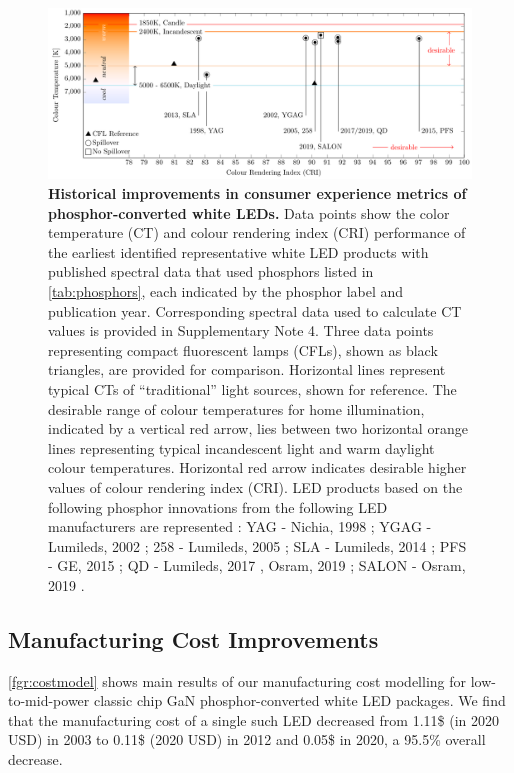 \documentclass[parskip=full]{article}
\begin{document}
\begin{figure}[h!]
 \centering
 \includegraphics[width=\textwidth]{figures/breakthroughs_consumer-experience.pdf}
 \caption{\textbf{Historical improvements in consumer experience metrics of phosphor-converted white LEDs.} Data points show the color temperature (CT) and colour rendering index (CRI) performance of the earliest identified representative white LED products with published spectral data that used phosphors listed in \cref{tab:phosphors}, each indicated by the phosphor label and publication year. Corresponding spectral data used to calculate CT values is provided in Supplementary Note 4. Three data points representing compact fluorescent lamps (CFLs)\cite{cie_reference}, shown as black triangles, are provided for comparison. Horizontal lines represent typical CTs of “traditional” light sources, shown for reference. The desirable range of colour temperatures for home illumination, indicated by a vertical red arrow, lies between two horizontal orange lines representing typical incandescent light and warm daylight colour temperatures. Horizontal red arrow indicates desirable higher values of colour rendering index (CRI). LED products based on the following phosphor innovations from the following LED manufacturers are represented : YAG - Nichia, 1998 \cite{bando1998development}; YGAG - Lumileds, 2002 \cite{Mueller2002}; 258 - Lumileds, 2005 \cite{MuellerMach2005}; SLA - Lumileds, 2014 \cite{Pust2014}; PFS - GE, 2015 \cite{Murphy2015}; QD - Lumileds, 2017 \cite{lumileds2016qd}, Osram, 2019 \cite{osram2019qd}; SALON - Osram, 2019 \cite{Hoerder2019}.}
 \label{fgr:consumer_experience}
\end{figure}

\subsection{Manufacturing Cost Improvements}

\cref{fgr:costmodel} shows main results of our manufacturing cost modelling for low-to-mid-power classic chip GaN phosphor-converted white LED packages. We find that the manufacturing cost of a single such LED decreased from 1.11\$ (in 2020 USD) in 2003 to 0.11\$ (2020 USD) in 2012 and 0.05\$ in 2020, a 95.5\% overall decrease.
\end{document}
